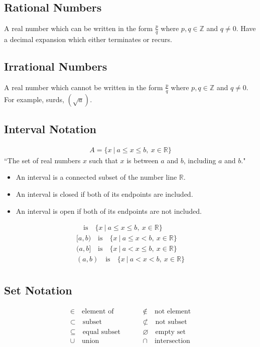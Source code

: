 \documentclass[10pt, a4paper, titlepage]{article}
\begin{document}
\begin{multicols*}{3}
\dotfill
\subsection{Rational Numbers}
A real number which can be written in the form $\frac{p}{q}$ where $p,q\in \mathbb{Z}$ and $q\neq 0$. Have a decimal expansion which either terminates or recurs.\\

\dotfill
\subsection{Irrational Numbers}
A real number which cannot be written in the form $\frac{p}{q}$ where $p,q\in \mathbb{Z}$ and $q\neq 0$. For example, surds, $(\sqrt{a})$.\\

\dotfill
\subsection{Interval Notation}
\begin{align}
	A=\{x\ |\ a\leq x\leq b,\ x\in \mathbb{R}\}
\end{align}
``The set of real numbers $x$ such that $x$ is between $a$ and $b$, including $a$ and $b$."
\begin{itemize}
	\item An interval is a connected subset of the number line $\mathbb{R}$.
	\item An interval is closed if both of its endpoints are included.
	\item An interval is open if both of its endpoints are not included.
\end{itemize}
\begin{align}
	[a,b]\quad \text{is}\quad \{x\ |\ a\leq x\leq b,\ x\in \mathbb{R}\}\\
	[a,b)\quad \text{is}\quad \{x\ |\ a\leq x<b,\ x\in \mathbb{R}\}\\
	(a,b]\quad \text{is}\quad \{x\ |\ a<x\leq b,\ x\in \mathbb{R}\}\\
	(a,b)\quad \text{is}\quad \{x\ |\ a<x<b,\ x\in \mathbb{R}\}\\
\end{align}
\dotfill
\subsection{Set Notation}
\begin{align}
	&\in \quad \text{element of}&& &&\notin \quad \text{not element}&\\
	&\subset \quad \text{subset}&& &&\not\subset \quad \text{not subset}&\\
	&\subseteq \quad \text{equal subset}&& &&\varnothing \quad \text{empty set}\\
	&\cup \quad \text{union}&& &&\cap \quad \text{intersection}&	
\end{align}
\dotfill

\end{multicols*}
\end{document}
